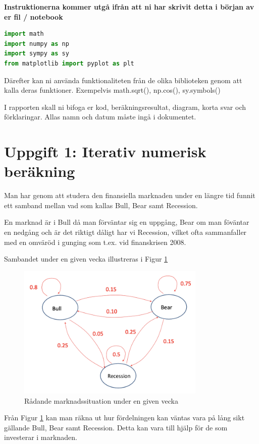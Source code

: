 \documentclass[a4paper]{article}
\begin{document}
\textbf{Instruktionerna kommer utgå ifrån att ni har skrivit detta i början av er fil / notebook}
\begin{lstlisting}[language=Python]
import math 
import numpy as np
import sympy as sy
from matplotlib import pyplot as plt
\end{lstlisting}

Därefter kan ni använda funktionaliteten från de olika biblioteken genom att
kalla deras funktioner. Exempelvis math.sqrt(), np.cos(), sy.symbols()

I rapporten skall ni bifoga er kod, beräkningsresultat, diagram, korta svar och förklaringar.
Allas namn och datum måste ingå i dokumentet.

\newpage
\section{Uppgift 1: Iterativ numerisk beräkning}
Man har genom att studera den finansiella marknaden under en längre tid funnit ett samband mellan vad som kallas Bull, Bear samt Recession.

En marknad är i Bull då man förväntar sig en uppgång, Bear om man föväntar en nedgång och är det riktigt dåligt har vi Recession, vilket ofta sammanfaller
med en omväröd i gunging som t.ex. vid finanskrisen 2008.

Sambandet under en given vecka illustreras i Figur \ref{fig:bbr}

\begin{figure}[H]
  \centering
  \includegraphics[width=0.8\textwidth]{bbr.png}
  \caption{Rådande marknadssituation under en given vecka}
  \label{fig:bbr}
\end{figure}

Från Figur \ref{fig:bbr} kan man räkna ut hur fördelningen kan väntas vara på lång sikt gällande Bull, Bear samt Recession.
Detta kan vara till hjälp för de som investerar i marknaden.
\end{document}
